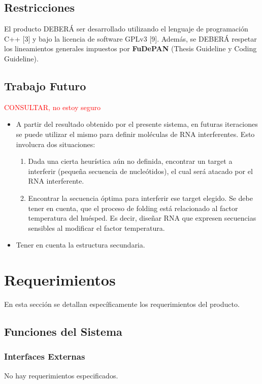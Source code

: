 \documentclass[12pt,a4paper,spanish]{article}
\begin{document}
\subsection{Restricciones}
	El producto DEBERÁ ser desarrollado utilizando el lenguaje de programación C++ [3] y bajo la licencia de software 		GPLv3 [9]. Además, se DEBERÁ respetar los lineamientos generales impuestos por \textbf{FuDePAN} (Thesis Guideline y Coding Guideline). 

\subsection{Trabajo Futuro}
\textcolor{red}{CONSULTAR, no estoy seguro}
\begin{itemize}
	\item A partir del resultado obtenido por el presente sistema, en futuras iteraciones se puede utilizar el mismo para definir moléculas de RNA 			  interferentes. Esto involucra dos situaciones:
		 \begin{enumerate}
			\item Dada una cierta heurística aún no definida, encontrar un target a interferir (pequeña secuencia de nucleótidos), el cual será atacado 		  		  por el RNA interferente.
			\item Encontrar la secuencia óptima para interferir ese target elegido. Se debe tener en cuenta, que el proceso de folding está relacionado 				  al factor temperatura del huésped. Es decir, diseñar RNA que expresen secuencias sensibles al modificar el factor temperatura.
		  \end{enumerate}
	\item Tener en cuenta la estructura secundaria.
\end{itemize}

\section{Requerimientos}
\label{section-req} 
En esta sección se detallan específicamente los requerimientos del producto. 

\subsection{Funciones del Sistema}

	\subsubsection{Interfaces Externas}
		No hay requerimientos especificados.
		
\end{document}
